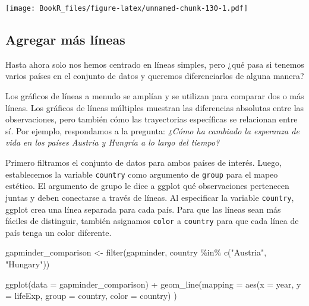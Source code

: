 \documentclass[
]{book}
\newenvironment{Shaded}{\begin{snugshade}}{\end{snugshade}}
\newcommand{\AttributeTok}[1]{\textcolor[rgb]{0.77,0.63,0.00}{#1}}
\newcommand{\FunctionTok}[1]{\textcolor[rgb]{0.00,0.00,0.00}{#1}}
\newcommand{\NormalTok}[1]{#1}
\newcommand{\OtherTok}[1]{\textcolor[rgb]{0.56,0.35,0.01}{#1}}
\newcommand{\SpecialCharTok}[1]{\textcolor[rgb]{0.00,0.00,0.00}{#1}}
\newcommand{\StringTok}[1]{\textcolor[rgb]{0.31,0.60,0.02}{#1}}
\begin{document}
\texttt{[image: BookR\_files/figure-latex/unnamed-chunk-130-1.pdf]}

\hypertarget{agregar-muxe1s-luxedneas}{%
\subsection{Agregar más líneas}\label{agregar-muxe1s-luxedneas}}

Hasta ahora solo nos hemos centrado en líneas simples, pero ¿qué pasa si tenemos varios países en el conjunto de datos y queremos diferenciarlos de alguna manera?

Los gráficos de líneas a menudo se amplían y se utilizan para comparar dos o más líneas. Los gráficos de líneas múltiples muestran las diferencias absolutas entre las observaciones, pero también cómo las trayectorias específicas se relacionan entre sí. Por ejemplo, respondamos a la pregunta: \emph{¿Cómo ha cambiado la esperanza de vida en los países Austria y Hungría a lo largo del tiempo?}

Primero filtramos el conjunto de datos para ambos países de interés. Luego, establecemos la variable \texttt{country} como argumento de \texttt{group} para el mapeo estético. El argumento de grupo le dice a ggplot qué observaciones pertenecen juntas y deben conectarse a través de líneas. Al especificar la variable \texttt{country}, ggplot crea una línea separada para cada país. Para que las líneas sean más fáciles de distinguir, también asignamos \texttt{color} a \texttt{country} para que cada línea de país tenga un color diferente.

\begin{Shaded}
\begin{Highlighting}[]
\NormalTok{gapminder\_comparison }\OtherTok{\textless{}{-}} 
  \FunctionTok{filter}\NormalTok{(gapminder, country }\SpecialCharTok{\%in\%} \FunctionTok{c}\NormalTok{(}\StringTok{"Austria"}\NormalTok{, }\StringTok{"Hungary"}\NormalTok{))}

\FunctionTok{ggplot}\NormalTok{(}\AttributeTok{data =}\NormalTok{ gapminder\_comparison) }\SpecialCharTok{+} 
  \FunctionTok{geom\_line}\NormalTok{(}\AttributeTok{mapping =} \FunctionTok{aes}\NormalTok{(}\AttributeTok{x =}\NormalTok{ year, }\AttributeTok{y =}\NormalTok{ lifeExp, }
                          \AttributeTok{group =}\NormalTok{ country, }
                          \AttributeTok{color =}\NormalTok{ country)}
\NormalTok{            )}
\end{Highlighting}
\end{Shaded}
\end{document}
